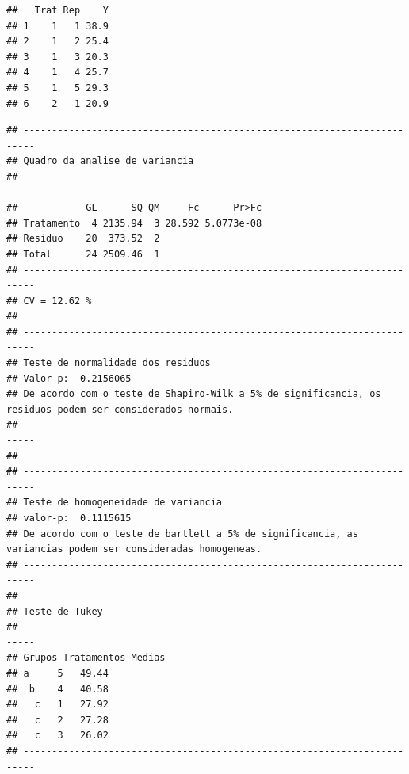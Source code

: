 \documentclass[
]{book}
\newenvironment{Shaded}{\begin{snugshade}}{\end{snugshade}}
\newcommand{\CommentTok}[1]{\textcolor[rgb]{0.56,0.35,0.01}{\textit{#1}}}
\newcommand{\DataTypeTok}[1]{\textcolor[rgb]{0.13,0.29,0.53}{#1}}
\newcommand{\KeywordTok}[1]{\textcolor[rgb]{0.13,0.29,0.53}{\textbf{#1}}}
\newcommand{\NormalTok}[1]{#1}
\newcommand{\OperatorTok}[1]{\textcolor[rgb]{0.81,0.36,0.00}{\textbf{#1}}}
\newcommand{\StringTok}[1]{\textcolor[rgb]{0.31,0.60,0.02}{#1}}
\begin{document}
\begin{verbatim}
##   Trat Rep    Y
## 1    1   1 38.9
## 2    1   2 25.4
## 3    1   3 20.3
## 4    1   4 25.7
## 5    1   5 29.3
## 6    2   1 20.9
\end{verbatim}

\begin{Shaded}
\end{Shaded}

\begin{verbatim}
## ------------------------------------------------------------------------
## Quadro da analise de variancia
## ------------------------------------------------------------------------
##            GL      SQ QM     Fc      Pr>Fc
## Tratamento  4 2135.94  3 28.592 5.0773e-08
## Residuo    20  373.52  2                  
## Total      24 2509.46  1                  
## ------------------------------------------------------------------------
## CV = 12.62 %
## 
## ------------------------------------------------------------------------
## Teste de normalidade dos residuos 
## Valor-p:  0.2156065 
## De acordo com o teste de Shapiro-Wilk a 5% de significancia, os residuos podem ser considerados normais.
## ------------------------------------------------------------------------
## 
## ------------------------------------------------------------------------
## Teste de homogeneidade de variancia 
## valor-p:  0.1115615 
## De acordo com o teste de bartlett a 5% de significancia, as variancias podem ser consideradas homogeneas.
## ------------------------------------------------------------------------
## 
## Teste de Tukey
## ------------------------------------------------------------------------
## Grupos Tratamentos Medias
## a 	 5 	 49.44 
##  b 	 4 	 40.58 
##   c 	 1 	 27.92 
##   c 	 2 	 27.28 
##   c 	 3 	 26.02 
## ------------------------------------------------------------------------
\end{verbatim}
\end{document}
